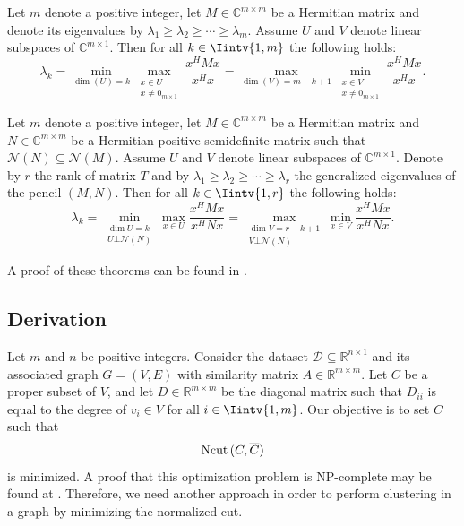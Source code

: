 \begin{theorem} \label{minmax1}
   Let $m$ denote a positive integer, let $M \in \mathbb{C}^{m \times m}$ be a Hermitian matrix and denote its eigenvalues by $\lambda_1 \ge \lambda_2 \ge \cdots \ge \lambda_m$. 
   Assume $U$ and $V$ denote linear subspaces of $\mathbb C^{m \times 1}$.
   Then for all $k \in \Iintv{1,m}$ the following holds:
\begin{equation}
   \lambda_k = \min_{\dim (U) = k} \max_{\substack{x \in U \\ x \ne 0_{m \times 1}}} \frac{x^HMx}{x^Hx} = \max_{\dim (V) = m-k+1} \min_{\substack{x \in V \\ x \ne 0_{m \times 1}}} \frac{x^HMx}{x^Hx}.
\end{equation}
\end{theorem}

\begin{theorem} \label{minmax2}
   Let $m$ denote a positive integer, let $M \in \mathbb {C} ^{m \times m}$ be a Hermitian matrix and $N \in \mathbb C ^{m \times m}$ be a Hermitian positive semidefinite matrix such that $\mathcal N (N)  \subseteq \mathcal N (M)$.
   Assume $U$ and $V$ denote linear subspaces of $\mathbb C^{m \times 1}$.
   Denote by $r$ the rank of matrix $T$ and by $\lambda_1 \ge \lambda_2 \ge \cdots \ge \lambda_r$ the generalized eigenvalues of the pencil $(M,N)$.
   Then for all $k \in \Iintv{1,r}$ the following holds:
   \begin{equation}
      \lambda_k = \min_{\substack{ \dim U = k \\ U \bot \mathcal N (N)}} \max_{x \in U} \frac{x^HMx}{x^HNx} = \max_{\substack{\dim  V = r - k + 1 \\ V \bot \mathcal N (N)}} \min_{x \in V} \frac{x^HMx}{x^HNx}.
   \end{equation}
\end{theorem}
A proof of these theorems can be found in \cite{minmax}.

\subsection{Derivation}

Let $m$ and $n$ be positive integers. 
Consider the dataset $\mathcal D \subseteq \mathbb R ^{n \times 1}$ and its associated graph $G = (V,E)$ with similarity matrix $A \in \mathbb R^{m \times m}$.
Let $C$ be a proper subset of $V$, and let $D \in \mathbb R ^{m \times m}$ be the diagonal matrix such that $D_{ii}$ is equal to the degree of $v_i \in V$ for all $i \in \Iintv{1,m}$.
Our objective is to set $C$ such that 
\begin{equation}
   \operatorname*{Ncut\,} (C, \overline C)
\end{equation}
is minimized.
A proof that this optimization problem is NP-complete may be found at \cite{normalized}. 
Therefore, we need another approach in order to perform clustering in a graph by minimizing the normalized cut.


